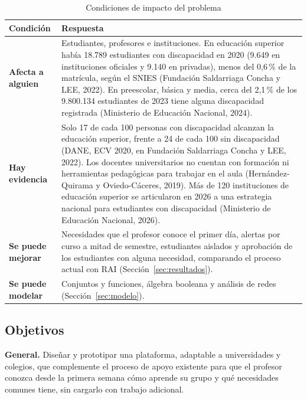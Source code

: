 \documentclass[12pt,letterpaper]{article}
\begin{document}
\begin{table}[H]
\centering
\caption{Condiciones de impacto del problema}
\label{tab:impacto}
\small
\begin{tabularx}{\textwidth}{>{\bfseries}p{2.6cm}L}
\toprule
Condición & Respuesta \\
\midrule
Afecta a alguien & Estudiantes, profesores e instituciones. En educación superior había 18.789 estudiantes con discapacidad en 2020 (9.649 en instituciones oficiales y 9.140 en privadas), menos del 0,6\,\% de la matrícula, según el SNIES (Fundación Saldarriaga Concha y LEE, 2022). En preescolar, básica y media, cerca del 2,1\,\% de los 9.800.134 estudiantes de 2023 tiene alguna discapacidad registrada (Ministerio de Educación Nacional, 2024). \\
Hay evidencia & Solo 17 de cada 100 personas con discapacidad alcanzan la educación superior, frente a 24 de cada 100 sin discapacidad (DANE, ECV 2020, en Fundación Saldarriaga Concha y LEE, 2022). Los docentes universitarios no cuentan con formación ni herramientas pedagógicas para trabajar en el aula (Hernández-Quirama y Oviedo-Cáceres, 2019). Más de 120 instituciones de educación superior se articularon en 2026 a una estrategia nacional para estudiantes con discapacidad (Ministerio de Educación Nacional, 2026). \\
Se puede mejorar & Necesidades que el profesor conoce el primer día, alertas por curso a mitad de semestre, estudiantes aislados y aprobación de los estudiantes con alguna necesidad, comparando el proceso actual con RAI (Sección~\ref{sec:resultados}). \\
Se puede modelar & Conjuntos y funciones, álgebra booleana y análisis de redes (Sección~\ref{sec:modelo}). \\
\bottomrule
\end{tabularx}
\end{table}

\subsection{Objetivos}
\textbf{General.} Diseñar y prototipar una plataforma, adaptable a universidades y colegios, que complemente el proceso de apoyo existente para que el profesor conozca desde la primera semana cómo aprende su grupo y qué necesidades comunes tiene, sin cargarlo con trabajo adicional.
\end{document}
